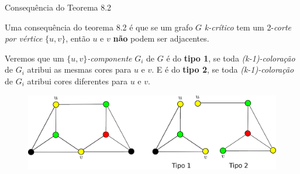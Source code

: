 \documentclass{beamer}
\begin{document}
\begin{frame}{Consequência do Teorema 8.2}{}

    \vskip 0.2cm
    \begin{outline}    
        \1[] \justifying Uma consequência do teorema 8.2 é que se um grafo $G$ \textit{k-crítico} tem  um 2-\textit{corte por vértice} $\{u, v\}$, então $u$ e $v$ \textbf{não} podem ser adjacentes. 
        \vskip 0.4cm
        \2 \begin{sloppypar} \justifying Veremos que um $\{u, v\}$\textit{-componente} $G_i$ de $G$ é do \textbf{tipo 1}, se toda \textit{(k-1)-coloração} de $G_i$ atribui as mesmas cores para $u$ e $v$. E é do \textbf{tipo 2}, se toda \textit{(k-1)-coloração} de $G_i$ atribui cores diferentes para $u$ e $v$. \end{sloppypar}    

    \end{outline}
    
    \begin{figure}
      \includegraphics[scale=0.3]{tipos.eps}      
      \caption{}      
    \end{figure}  

\end{frame}
\end{document}
